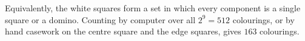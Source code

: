 Equivalently, the white squares form a set in which every component is a single square or a domino. Counting by computer over all $2^9=512$ colourings, or by hand casework on the centre square and the edge squares, gives $\boxed{163}$ colourings.
